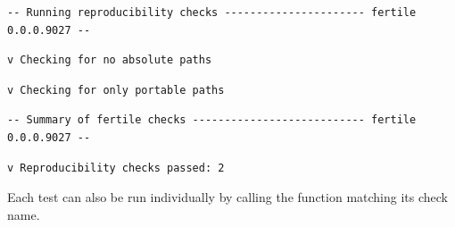 \documentclass[12pt,twoside]{reedthesis}
\begin{document}
\begin{verbatim}
-- Running reproducibility checks ---------------------- fertile 0.0.0.9027 --
\end{verbatim}
\begin{verbatim}
v Checking for no absolute paths
\end{verbatim}
\begin{verbatim}
v Checking for only portable paths
\end{verbatim}
\begin{verbatim}
-- Summary of fertile checks --------------------------- fertile 0.0.0.9027 --
\end{verbatim}
\begin{verbatim}
v Reproducibility checks passed: 2
\end{verbatim}
Each test can also be run individually by calling the function matching
its check name.
\end{document}
